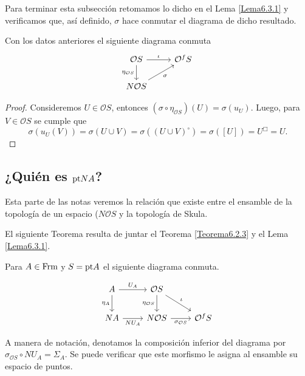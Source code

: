 Para terminar esta subsección retomamos lo dicho en el Lema \ref{Lema6.3.1} y verificamos que, así definido, $\sigma$ hace conmutar el diagrama de dicho resultado.

\begin{lem}\label{Lema6.3.6}
    Con los datos anteriores el siguiente diagrama conmuta
    \[\begin{tikzcd}
	{\mathcal{O}S} & {\mathcal{O} ^fS} \\
	{N\mathcal{O}S}
	\arrow["\iota", from=1-1, to=1-2]
	\arrow["{\eta_{\mathcal{O}S}}"', from=1-1, to=2-1]
	\arrow["\sigma"', from=2-1, to=1-2]
\end{tikzcd}\]
\end{lem}

\begin{proof}
    Consideremos $U\in \mathcal{O}S$, entonces $(\sigma\circ \eta_{\mathcal{O}S})(U)=\sigma(u_U)$. Luego, para $V\in \mathcal{O}S$ se cumple que 
    \[
    \sigma(u_U(V))=\sigma(U\cup V)=\sigma((U\cup V)^\circ)=\sigma([U])=U^\Box=U.
    \]
\end{proof}

\subsection{¿Quién es $\mathrm{pt} NA$?}

Esta parte de las notas veremos la relación que existe entre el ensamble de la topología de un espacio ($N\mathcal{O}S$ y la topología de Skula. 

El siguiente Teorema resulta de juntar el Teorema \ref{Teorema6.2.3} y el Lema \ref{Lema6.3.1}.

\begin{thm}\label{Teorema6.4.1}
    Para $A\in \mathrm{Frm}$ y $S=\mathrm{pt} A$ el siguiente diagrama conmuta.

    \[\begin{tikzcd}
	A & {\mathcal{O}S} \\
	NA & {N\mathcal{O}S} & {\mathcal{O}^fS}
	\arrow["{U_A}", from=1-1, to=1-2]
	\arrow["{\eta_A}"', from=1-1, to=2-1]
	\arrow["{\eta_{\mathcal{O}S}}"', from=1-2, to=2-2]
	\arrow["\iota", from=1-2, to=2-3]
	\arrow["{NU_A}"', from=2-1, to=2-2]
	\arrow["{\sigma_{\mathcal{O}S}}"', from=2-2, to=2-3]
\end{tikzcd}\]
\end{thm}

A manera de notación, denotamos la composición inferior del diagrama por $\sigma_{\mathcal{O}S}\circ NU_A=\Sigma_A$. Se puede verificar que este morfismo le asigna al ensamble su espacio de puntos.

